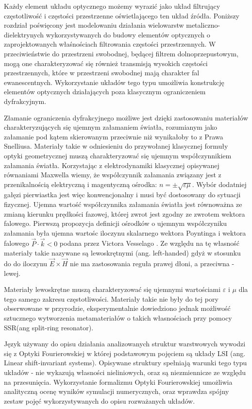 Każdy element układu optycznego możemy wyrazić jako układ filtrujący częstotliwość i częstości przestrzenne oświetlającego ten układ źródła. Poniższy rozdział poświęcony jest modelowaniu działania wielowarstw metaliczno-dielektrynych wykorzystywanych do  budowy elementów optycznych o zaprojektowanych właśnościach filtrowania częstości przestrzennych. W przeciwieństwie do przestrzeni swobodnej, będącej filtrem dolnoprzepustowym, mogą one charakteryzować się również transmisją wysokich częstości przestrzennych, które w przestrzeni swobodnej mają charakter fal ewanescentnych. Wykorzystanie układów tego typu umożliwia konstrukcję elementów optycznych działających poza klasycznym ograniczeniem dyfrakcyjnym.

Złamanie ograniczenia dyfrakcyjnego możliwe jest dzięki zastosowaniu materiałów charakteryzujących się ujemnym załamaniem światła, rozumianym jako załamanie pod kątem skierowanym przeciwnie niż wynikałoby to z Prawa Snelliusa. Materiały takie w odniesieniu do przywołanej klasycznej formuły optyki geometrycznej muszą charakteryzować się ujemnym współczynnikiem załamania światła. Korzystając z elektrodynamiki klasycznej opisywanej równaniami Maxwella wiemy, że współczynnik załamania związany jest z przenikalnością elektryczną i magentyczną ośrodka: $n = \pm \sqrt{ \varepsilon \mu}$. Wybór dodatniej gałęzi pierwiastka jest więc konwencjonalny i musi być dostosowany do sytuacji fizycznej. Ujemna wartość współczynnika załamania światła jest równoważna ze zmianą kierunku prędkości fazowej, której zwrot jest zgodny ze zwrotem wektora falowego. Pierwszą propozycja definicji ośrodków o ujemnym współczyniku załamania była ujemna wartośc iloczynu skalarnego wektora Poyntinga i wektora falowego $\vec{P} \cdot \vec{k} < 0$ podana przez Victora Vesselago \cite{veselago1968electrodynamics}. Ze względu na tę własność materiały takie nazywane są lewoskrętnymi (ang. left-handed) gdyż w stosunku do do iloczynu $\vec{E} \times \vec{H}$ nie ma zastosowania reguła prawej dłoni, a przeciwna - lewej.

Materiały lewoskrętne muszą charakteryzować się ujemnymi wartościami $\varepsilon$ i $\mu$ dla tego samego zakresu częstotliwości. Materiały takie nie były do tej pory obserwowane w przyrodzie, eksperymentalnie dowiedziono jednak możliwość sztucznego wytworzenia metamateriałów o takich własnościach\cite{PhysRevLett.84.4184} przy pomocy SSR(ang split-ring resonator). 

Język używany do opisu działania analizowanych struktur warstwowych wywodzi się z Optyki Fourierowskiej w której podstawowym pojęciem są układy LSI (ang. Linear shift-invariant systems). Opisywane struktury spełniają warunki tego typu układów - nie wykazują własności nieliniowych, oraz są niezmiennicze ze względu na przesunięcia. Wykorzystanie formalizmu Optyki Fourierowskiej umożliwia analityczną ocenę wyników symulacji numerycznych, oraz wprawdza spójny zestaw pojęć wykorzystywanych do opisu rozważanych układów.


